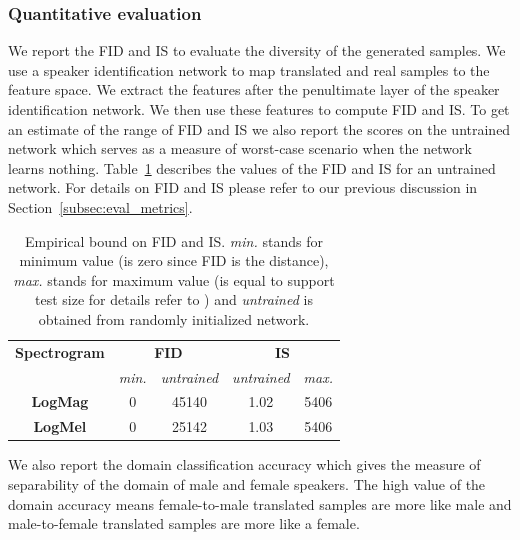 \subsubsection{Quantitative evaluation}
We report the FID and IS to evaluate the diversity of the generated samples. 
We use a speaker identification network to map translated and real samples to the feature space. We extract the features after the penultimate layer of the speaker identification network. We then use these features to compute FID and IS. To get an estimate of the range of FID and IS we also report the scores on the untrained network which serves as a measure of worst-case scenario when the network learns nothing. Table~\ref{tab:fid_is_base} describes the values of the FID and IS for an untrained network. For details on FID and IS please refer to our previous discussion in Section~\ref{subsec:eval_metrics}. 

\begin{table}[h]
    \centering
    \begin{tabular}{ccccc}
    \toprule
    \textbf{Spectrogram} &  \multicolumn{2}{c}{\textbf{FID}} & \multicolumn{2}{c}{\textbf{IS}}\\
    & \emph{min.} & \emph{untrained} & \emph{untrained} & \emph{max.} \\
    \midrule
    \textbf{LogMag} & 0 & 45140 & 1.02 & 5406\\
    \textbf{LogMel} & 0 & 25142 & 1.03 & 5406\\
    \bottomrule
    \end{tabular}
    \caption[Empirical bound on FID and IS]{Empirical bound on FID and IS. \emph{min.} stands for minimum value (is zero since FID is the distance), \emph{max.} stands for maximum value (is equal to support test size for details refer to \cite{heusel2017gans}) and \emph{untrained} is obtained from randomly initialized network.}
    \label{tab:fid_is_base}
\end{table}

We also report the domain classification accuracy which gives the measure of separability of the domain of male and female speakers. The high value of the domain accuracy means female-to-male translated samples are more like male and male-to-female translated samples are more like a female.

